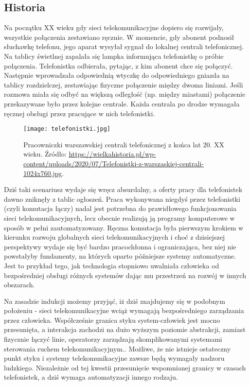 \subsection{Historia}

Na początku XX wieku gdy sieci telekomunikacyjne dopiero się rozwijały, wszystkie połączenia zestawiano ręcznie. W momencie, gdy abonent podnosił słuchawkę telefonu, jego aparat wysyłał sygnał do lokalnej centrali telefonicznej. Na tablicy świetlnej zapalała się lampka informująca telefonistkę o próbie połączenia. Telefonistka odbierała, pytając, z kim abonent chce się połączyć. Następnie wprowadzała odpowiednią wtyczkę do odpowiedniego gniazda na tablicy rozdzielczej, zestawiając fizyczne połączenie między dwoma liniami. Jeśli rozmowa miała się odbyć na większą odległość (np. między miastami) połączenie przekazywane było przez kolejne centrale. Każda centrala po drodze wymagała ręcznej obsługi przez pracujące w nich telefonistki. 

\begin{figure}[!htbp]
    \centering \texttt{[image: telefonistki.jpg]}
    \caption{Pracowniczki warszawskiej centrali telefonicznej z końca lat 20. XX wieku. Źródło: \url{https://wielkahistoria.pl/wp-content/uploads/2020/07/Telefonistki-z-warszaskiej-centrali-1024x760.jpg}.}\label{fig:telefonistki}
\end{figure}

Dziś taki scenariusz wydaje się wręcz absurdalny, a oferty pracy dla telefonistek dawno zniknęły z tablic ogłoszeń. Praca wykonywana niegdyś przez telefonistki (czyli komutacja łączy) nadal jest potrzebna do prawidłowego funkcjonowania sieci telekomunikacyjnych, lecz obecnie realizują ją programy komputerowe w sposób w pełni zautomatyzowany. Ręczna komutacja była pierwszym krokiem w kierunku rozwoju globalnych sieci telekomunikacyjnych i choć z dzisiejszej perspektywy wydaje się być bardzo pracochłonna i ograniczająca, bez niej nie powstałyby fundamenty, na których oparto późniejsze systemy automatyczne. Jest to przykład tego, jak technologia stopniowo uwalniała człowieka od bezpośredniej obsługi różnych systemów dając mu przestrzeń na rozwój w innych obszarach.

Na zasadzie indukcji możemy przyjąć, iż dziś znajdujemy się w podobnym położeniu - sieci telekomunikacyjne wciąż wymagają bezpośredniego zarządzania przez człowieka. Współcześnie granica styku system-człowiek jest mocno przesunięta, a interakcja zachodzi na dużo wyższym poziomie abstrakcji, zamiast fizycznie łączyć linie, operatorzy zarządzają skomplikowanymi systemami sterowania ruchem telekomunikacyjnym.. Możliwe, że nie istnieje ostateczny punkt styku i systemy telekomunikacyjne zawsze będą wymagały nadzoru ludzkiego. Niezależnie od tej kwestii przesunięcie wspomnianej granicy w czasach telefonistek, a dziś wymaga automatyzacji innego rodzaju. 

